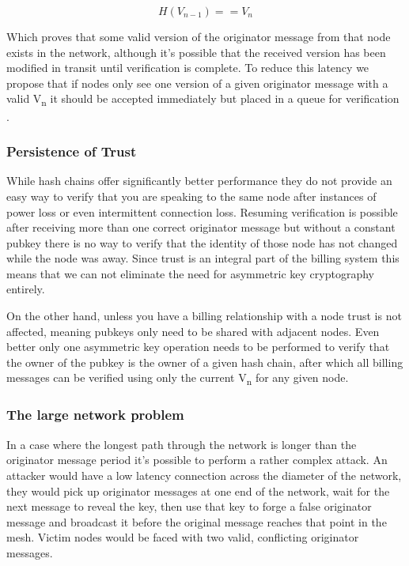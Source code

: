 \documentclass[11pt]{article}
\begin{document}
                     \[H(V_{n-1}) == V_n\]
                     
               Which proves that some valid version of the originator message from that node exists in the network, although it's possible that the received version has been modified in transit until verification is complete. To reduce this latency we propose that if nodes only see one version of a given originator message with a valid V\textsubscript{n} it should be accepted immediately but placed in a queue for verification \cite{spins,hash}.
               
               \subsubsection{Persistence of Trust}
               
                      While hash chains offer significantly better performance they do not provide an easy way to verify that you are speaking to the same node after instances of power loss or even intermittent connection loss. Resuming verification is possible after receiving more than one correct originator message but without a constant pubkey there is no way to verify that the identity of those node has not changed while the node was away. Since trust is an integral part of the billing system this means that we can not eliminate the need for asymmetric key cryptography entirely. 
                      
                      On the other hand, unless you have a billing relationship with a node trust is not affected, meaning pubkeys only need to be shared with adjacent nodes. Even better only one asymmetric key operation needs to be performed to verify that the owner of the pubkey is the owner of a given hash chain, after which all billing messages can be verified using only the current V\textsubscript{n} for any given node.
               
               \subsubsection{The large network problem}
                        
                        In a case where the longest path through the network is longer than the originator message period it's possible to perform a rather complex attack. An attacker would have a low latency connection across the diameter of the network, they would pick up originator messages at one end of the network, wait for the next message to reveal the key, then use that key to forge a false originator message and broadcast it before the original message reaches that point in the mesh. Victim nodes would be faced with two valid, conflicting originator messages.
                        
\end{document}
